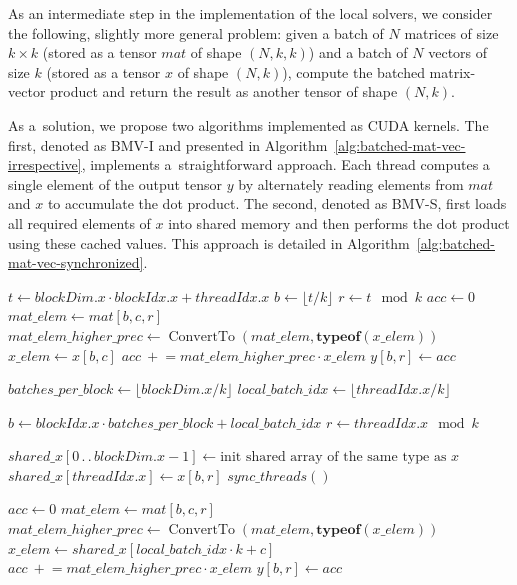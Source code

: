 \documentclass[11pt]{article}
\newcommand{\Call}[2]{\operatorname{#1}\!\left(#2\right)}
\newcommand*{\slice}{\ensuremath{\, . \, . \,}}
\theoremstyle{definition}
\theoremstyle{theorem}
\begin{document}
As an intermediate step in the implementation of the local solvers, we consider
the following, slightly more general problem:
given a batch of $N$ matrices of size $k \times k$ (stored as a tensor $mat$ of shape $(N, k, k)$)
and a batch of $N$ vectors of size $k$ (stored as a tensor $x$ of shape $(N, k)$),
compute the batched matrix-vector product and return the result as another tensor of
shape $(N, k)$.

As a~solution, we propose two algorithms implemented as CUDA kernels.
The first, denoted as BMV-I and presented in
Algorithm~\ref{alg:batched-mat-vec-irrespective}, implements a~straightforward approach.
Each thread computes a single element of the output tensor $y$ by alternately reading
elements from $mat$ and $x$ to accumulate the dot product. The second,
denoted as BMV-S, first loads all required elements of $x$ into shared memory
and then performs the dot product using these cached values. This approach is
detailed in Algorithm~\ref{alg:batched-mat-vec-synchronized}.

\begin{algorithm}
  \caption{Batched dense matrix-vector product -- BMV-I kernel}
  \label{alg:batched-mat-vec-irrespective}
  $t \gets blockDim.x \cdot blockIdx.x + threadIdx.x$\;
   { \Return }
  $b \gets \lfloor t / k \rfloor$\;
  $r \gets t \!\!\mod k$\;
  $acc \gets 0$\;
   {
    $mat\_elem \gets mat[b, c, r]$\;
    $mat\_elem\_higher\_prec \gets \Call{ConvertTo}{mat\_elem, \textbf{typeof}({x\_elem})}$\;
    $x\_elem \gets x[b, c]$\;
    $acc\ +\!= mat\_elem\_higher\_prec \cdot x\_elem$
  }
  $y[b, r] \gets acc$
\end{algorithm}

\begin{algorithm}
  \caption{Batched dense matrix-vector product -- BMV-S kernel}
  \label{alg:batched-mat-vec-synchronized}
  $batches\_per\_block \gets \lfloor blockDim.x / k \rfloor$\;
  $local\_batch\_idx \gets \lfloor threadIdx.x / k \rfloor$\;
   { \Return }

  $b \gets blockIdx.x \cdot batches\_per\_block + local\_batch\_idx$\;
  $r \gets threadIdx.x \!\!\mod k$\;
   { \Return }

  $shared\_x[0 \slice blockDim.x - 1] \gets \text{init shared array of the same type as } x$\;
  $shared\_x[threadIdx.x] \gets x[b, r]$\;
  $sync\_threads()$\;

  $acc \gets 0$\;
   {
    $mat\_elem \gets mat[b, c, r]$\;
    $mat\_elem\_higher\_prec \gets \Call{ConvertTo}{mat\_elem, \textbf{typeof}({x\_elem})}$\;
    $x\_elem \gets shared\_x[local\_batch\_idx \cdot k + c]$\;
    $acc\ +\!= mat\_elem\_higher\_prec \cdot x\_elem$
  }
  $y[b, r] \gets acc$
\end{algorithm}
\end{document}
